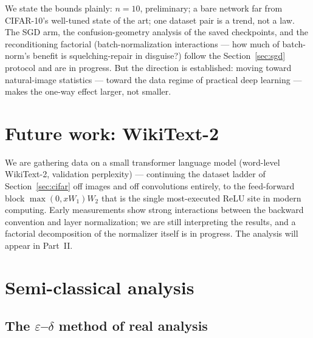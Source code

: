 \documentclass[11pt]{article}
\begin{document}
We state the bounds plainly: $n{=}10$, preliminary; a bare network
far from CIFAR-10's well-tuned state of the art; one dataset pair is
a trend, not a law. The SGD arm, the confusion-geometry analysis of
the saved checkpoints, and the reconditioning factorial
(batch-normalization interactions --- how much of batch-norm's
benefit is squelching-repair in disguise?) follow the
Section~\ref{sec:sgd} protocol and are in progress. But the
direction is established: moving toward natural-image statistics ---
toward the data regime of practical deep learning --- makes the
one-way effect larger, not smaller.

\section{Future work: WikiText-2}
\label{sec:wikitext}

We are gathering data on a small transformer language model
(word-level WikiText-2, validation perplexity) --- continuing the
dataset ladder of Section~\ref{sec:cifar} off images and off
convolutions entirely, to the feed-forward block
$\max(0, xW_1)W_2$ that is the single most-executed ReLU site in
modern computing. Early measurements show strong interactions
between the backward convention and layer normalization; we are
still interpreting the results, and a factorial decomposition of
the normalizer itself is in progress. The analysis will appear in
Part~II.

\section{Semi-classical analysis}
\label{sec:onesided}

\subsection{The $\varepsilon$--$\delta$ method of real analysis}
\end{document}
